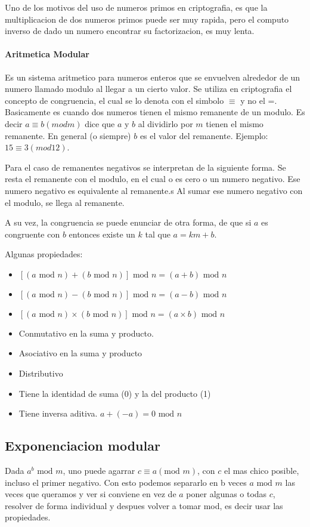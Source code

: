\documentclass[12pt, oneside]{article}
\begin{document}
Uno de los motivos del uso de numeros primos en criptografia, es que la multiplicacion
de dos numeros primos puede ser muy rapida, pero el computo inverso de dado un numero
encontrar su factorizacion, es muy lenta.

 \paragraph{Aritmetica Modular}
Es un sistema aritmetico para numeros enteros que se envuelven alrededor
de un numero llamado modulo al llegar a un cierto valor.
Se utiliza en criptografia el concepto de congruencia, el cual se lo denota con
el simbolo $\equiv$ y no el =.
Basicamente es cuando dos numeros tienen el mismo remanente de un modulo.
Es decir $a \equiv b (mod m)$ dice que $a$ y $b$ al dividirlo por $m$ tienen el mismo
remanente.
En general (o siempre) $b$ es el valor del remanente.
Ejemplo: $15\equiv 3 (mod 12)$.

Para el caso de remanentes negativos se interpretan de la siguiente forma.
Se resta el remanente con el modulo, en el cual o es cero o un numero negativo.
Ese numero negativo es equivalente al remanente.s
Al sumar ese numero negativo con el modulo, se llega al remanente.

A su vez, la congruencia se puede enunciar de otra forma, de que si $a$ es congruente
con $b$ entonces existe un $k$ tal que $a=km+b$.

Algunas propiedades:
\begin{itemize}
    \item $[(a\text{ mod }n) + (b\text{ mod }n)]\text{ mod }n = (a+b)\text{ mod }n$
    \item $[(a\text{ mod }n) - (b\text{ mod }n)]\text{ mod }n = (a-b)\text{ mod }n$
    \item $[(a\text{ mod }n) \times (b\text{ mod }n)]\text{ mod }n = (a\times b)\text{ mod }n$
    \item Conmutativo en la suma y producto.
    \item Asociativo en la suma y producto
    \item Distributivo
    \item Tiene la identidad de suma (0) y la del producto (1)
    \item Tiene inversa aditiva. $a+(-a) = 0\text{ mod }n$
\end{itemize}



\subsection{Exponenciacion modular}
Dada $a^b\text{ mod }m$, uno puede agarrar $c \equiv a (\text{mod }m)$, con $c$
el mas chico posible, incluso el primer negativo.
Con esto podemos separarlo en b veces $a \text{ mod }m$ las veces que queramos
y ver si conviene en vez de $a$ poner algunas o todas $c$, resolver de forma
individual y despues volver a tomar  mod, es decir usar las propiedades.
\end{document}
